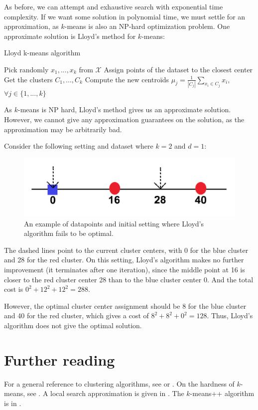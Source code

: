 As before, we can attempt and exhaustive search with exponential
time complexity. If we want some solution in polynomial time, we
must settle for an approximation, as $k$-means is also an NP-hard
optimization problem. One approximate solution is Lloyd's method
for $k$-means:

\begin{algorithm}
\caption{Lloyd k-means algorithm}
\begin{algorithmic} 
\STATE Pick randomly $x_1,...,x_k $ from $\mathcal{X}$ \;
\STATE Assign points of the dataset to the closest center \;
\STATE Get the clusters $C_1, ..., C_k$\;
\STATE Compute the new centroïds $\mu_j = \frac{1}{|C_j|}
\sum_{x_i\in C_j} x_i$, $\forall j \in \{1,...,k\}$\;
\ENDWHILE
\end{algorithmic}
\end{algorithm}

\begin{remark}
As $k$-means is NP hard, Lloyd's method gives us an approximate
solution. However, we cannot give any approximation guarantees
on the solution, as the approximation may be arbitrarily bad.
\end{remark}

\begin{example} Consider the following setting and dataset
where $k=2$ and $d=1$:
\begin{figure}
    \centering
    \captionsetup{width=0.8\textwidth}
    \includegraphics[scale=0.4]{chapter_1/files/kmeans.png}
    \caption{An example of datapoints and initial setting where
    Lloyd's algorithm fails to be optimal.}
    \label{fig:kmeans}
\end{figure}
The dashed lines point to the current cluster centers, with 0
for the blue cluster and 28 for the red cluster. On this
setting, Lloyd's algorithm makes no further improvement (it
terminates after one iteration), since the middle point at 16
is closer to the red cluster center 28 than to the blue cluster
center 0. And the total cost is $0^2+12^2+12^2=288$.

However, the optimal cluster center assignment should be 8 for
the blue cluster and 40 for the red cluster, which gives a cost
of $8^2+8^2+0^2=128$. Thus, Lloyd's algorithm does not give the
optimal solution.
\end{example}

\section{Further reading}
For a general reference to clustering algorithms, see \cite{har75}
or \cite{gon85}. On the hardness of $k$-means, see \cite{das2008}.
A local search approximation is given in \cite{kan2004}. The 
$k$-means++ algorithm is in \cite{art2007}.